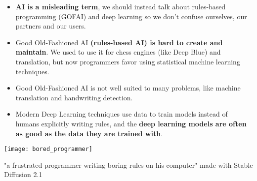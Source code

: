 \begin{itemize}
	\item \textbf{AI is a misleading term}, we should instead talk about rules-based programming (GOFAI) and deep learning so we don't confuse ourselves, our partners and our users. 
	\item Good Old-Fashioned AI \textbf{(rules-based AI) is hard to create and maintain}. We used to use it for chess engines (like Deep Blue) and translation, but now programmers favor using statistical machine learning techniques.
	\item Good Old-Fashioned AI is not well suited to many problems, like machine translation and handwriting detection.
	\item Modern Deep Learning techniques use data to train models instead of humans explicitly writing rules, and the \textbf{deep learning models are often as good as the data they are trained with}.
\end{itemize}

\begin{marginfigure}[-5.5cm]
        \texttt{[image: bored\_programmer]}
        \caption{"a frustrated programmer writing boring rules on his computer" made with Stable Diffusion 2.1}
\end{marginfigure}
